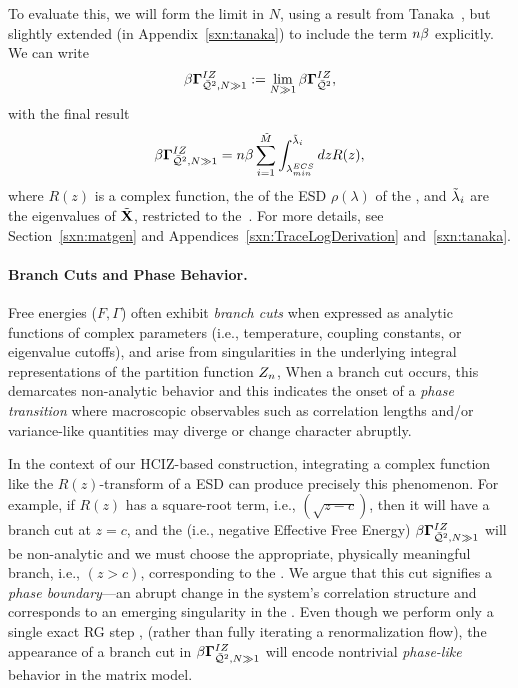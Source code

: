 To evaluate this, we will form the limit \LargeN in $N$, using a result from Tanaka~\cite{Tanaka2007,Tanaka2008},
but slightly extended (in Appendix~\ref{sxn:tanaka}) to include the term $n\beta$ explicitly.
We can write
\begin{align}
  \label{eqn:izgin_def}
  \beta\mathbf{\Gamma}^{IZ}_{\bar{\mathcal{Q}}^{2},N\gg 1}:=\lim_{N\gg 1}\beta\mathbf{\Gamma}^{IZ}_{\bar{\mathcal{Q}}^{2}} ,
\end{align}
with the final result
  \begin{align}
    \label{eqn:hciz_tanaka}
    \beta\mathbf{\Gamma}^{IZ}_{\bar{\mathcal{Q}}^{2},N\gg 1}=n\beta\sum_{i=1}^{\tilde{M}}\int^{\tilde{\lambda}_{i}}_{\lambda^{ECS}_{min}} dz R(z) ,
\end{align}
where $R(z)$ is a complex function, the \RTransform of the ESD $\rho(\lambda)$ of the \Teacher, and $\tilde{\lambda}_{i}$ are the eigenvalues of \Teacher \CorrelationMatrix $\tilde{\mathbf{X}}$, restricted to the~\ECS.
For more details, see Section~\ref{sxn:matgen} and Appendices~\ref{sxn:TraceLogDerivation} and~\ref{sxn:tanaka}.

\paragraph{Branch Cuts and Phase Behavior.}
Free energies ($F,\Gamma$)  often exhibit \emph{branch cuts} when expressed as analytic functions 
of complex parameters (i.e., temperature, coupling constants, or eigenvalue cutoffs),
and arise from singularities in the underlying integral representations of the partition function $Z_{n}$,
When a branch cut occurs, this demarcates non-analytic behavior
and this indicates the onset of a \emph{phase transition} where
macroscopic observables such as correlation lengths and/or variance-like quantities
may diverge or change character abruptly.  

In the context of our HCIZ-based construction, integrating a complex function like the $R(z)$-transform of
a \HeavyTailed ESD can produce precisely this phenomenon.
For example, if $R(z)$ has a square-root term, i.e., $(\sqrt{z-c})$, then it will have a branch cut at $z=c$,
and the \GeneratingFunction (i.e.,  negative Effective Free Energy) $\beta\mathbf{\Gamma}^{IZ}_{\bar{\mathcal{Q}}^{2},N\gg 1}$
will be non-analytic and we must choose the appropriate, physically meaningful branch, i.e., $(z>c)$,
corresponding to the \ECS.
We argue that this cut signifies a \emph{phase boundary}—an abrupt change
in the system’s correlation structure and corresponds to an emerging singularity in the \LayerQuality.
Even though we perform only a single exact RG step , 
(rather than fully iterating a renormalization flow), the appearance of a branch cut in $\beta\mathbf{\Gamma}^{IZ}_{\bar{\mathcal{Q}}^{2},N\gg 1}$ will encode
nontrivial \emph{phase-like} behavior in the \SETOL \HeavyTailed matrix model.


